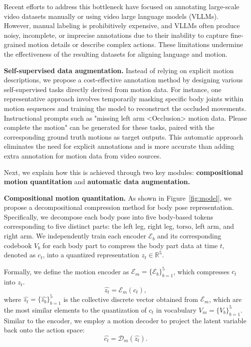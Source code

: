 Recent efforts to address this bottleneck have focused on annotating large-scale video datasets manually or using video large language models (VLLMs)\cite{zhang2023video}. However, manual labeling is prohibitively expensive, and VLLMs often produce noisy, incomplete, or imprecise annotations due to their inability to capture fine-grained motion details or describe complex actions. These limitations undermine the effectiveness of the resulting datasets for aligning language and motion.


\textbf{Self-supervised data augmentation.}
Instead of relying on explicit motion descriptions, we propose a cost-effective annotation method by designing various self-supervised tasks directly derived from motion data. For instance, one representative approach involves temporarily masking specific body joints within motion sequences and training the model to reconstruct the occluded movements. Instructional prompts such as "missing left arm <Occlusion> motion data. Please complete the motion" can be generated for these tasks, paired with the corresponding ground truth motions as target outputs. This automatic approach eliminates the need for explicit annotations and is more accurate than adding extra annotation for motion data from video sources.

Next, we explain how this is achieved through two key modules:
\textbf{compositional motion quantitation} and  \textbf{automatic data augmentation.}




\textbf{Compositional motion quantitation.}
As shown in Figure~\ref{fig:model}, we propose a decompositional compression method for body pose representation.
Specifically, we decompose each body pose into five body-based tokens corresponding to five distinct parts: the left leg, right leg, torso, left arm, and right arm. 
We independently train each encoder $\mathcal{E}_b$ and its corresponding codebook $V_b$ for each body part to compress the body part data at time $t$, denoted as $c_t$, into a quantized representation $z_t \in \mathbb{R}^{5}$. 

Formally, we define the motion encoder as $\mathcal{E}_m=\{\mathcal{E}_b\}_{b=1}^5$, which compresses $c_t$ into $z_t$.
\begin{equation}
    \hat{z_t} = \mathcal{E}_m(c_t),
\end{equation}
where $\hat{z_t}=\{\hat{z_b}\}_{b=1}^5$ is the collective discrete vector obtained from $\mathcal{E}_m$, which are the most similar elements to the quantization of $c_t$ in vocabulary $V_m=\{V_b\}_{b=1}^5$. Similar to the encoder, we employ a motion decoder to project the latent variable back onto the action space:
\begin{equation}
    \hat{c_t} = \mathcal{D}_m(\hat{z_t}).
\end{equation}



